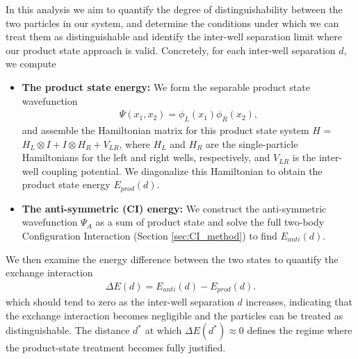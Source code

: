\documentclass{subfiles}
\begin{document}
In this analysis we aim to quantify the degree of distinguishability between the two particles in our system, and determine the conditions under which we can treat them as distinguishable and identify the inter-well separation limit where our product state approach is valid. Concretely, for each inter-well separation $d$, we compute
\begin{itemize}
    \item \textbf{The product state energy:}
    We form the separable product state wavefunction
    \begin{align*}
        \Psi(x_1, x_2) = \phi_L(x_1)\phi_R(x_2),
    \end{align*}
    and assemble the Hamiltonian matrix for this product state system $H$ = $H_L\otimes I + I \otimes H_R + V_{LR}$, where $H_L$ and $H_R$ are the single-particle Hamiltonians for the left and right wells, respectively, and $V_{LR}$ is the inter-well coupling potential. We diagonalize this Hamiltonian to obtain the product state energy $E_{prod}(d)$.
    \item \textbf{The anti-symmetric (CI) energy:}
    We construct the anti-symmetric wavefunction $\Psi_A$ as a sum of product state and solve the full two-body Configuration Interaction (Section \ref{sec:CI_method}) to find $E_{anti}(d)$. 
\end{itemize}
We then examine the energy difference between the two states to quantify the exchange interaction
\begin{align*}
    \Delta E(d) = E_{anti}(d) - E_{prod}(d).
\end{align*}
which should tend to zero as the inter-well separation $d$ increases, indicating that the exchange interaction becomes negligible and the particles can be treated as distinguishable. The distance $d^*$ at which $\Delta E(d^*) \approx 0$ defines the regime where the product-state treatment becomes fully justified.


\end{document}
